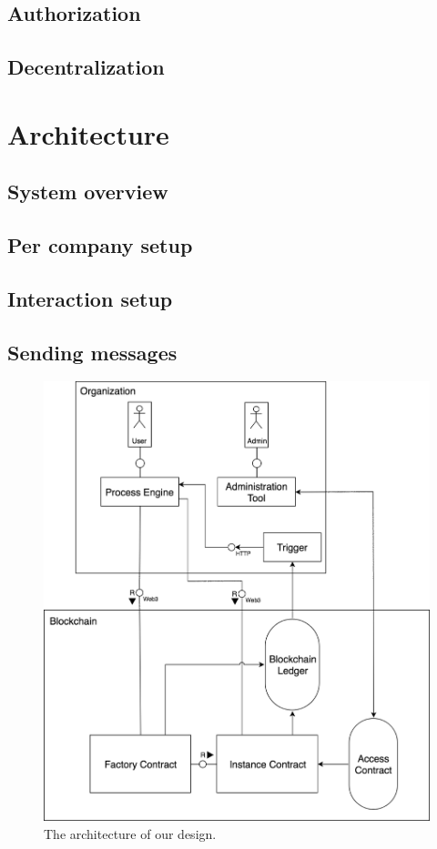\documentclass[runningheads]{llncs}
\begin{document}
\subsection{Authorization}

\subsection{Decentralization}

\section{Architecture}

\subsection{System overview}

\subsection{Per company setup}

\subsection{Interaction setup}

\subsection{Sending messages}

\begin{figure}
\includegraphics[width=\textwidth]{fig/system_diagram.eps}
\caption{The architecture of our design.} \label{fig1}
\end{figure}
\end{document}
